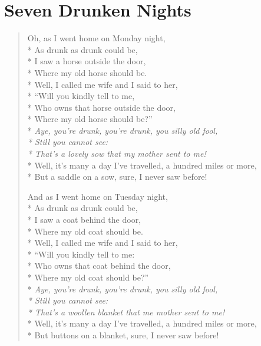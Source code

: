 \documentclass[9pt,twoside]{extarticle}
\newenvironment{xverse}{
	\begin{verse}
	\fontsize{8.5}{10.5}\selectfont
}{
	\end{verse}
}
\begin{document}
\section{Seven Drunken Nights}

\begin{xverse}
Oh, as I went home on Monday night, \\*
As drunk as drunk could be, \\*
I saw a horse outside the door, \\*
Where my old horse should be. \\*
Well, I called me wife and I said to her, \\*
“Will you kindly tell to me, \\*
Who owns that horse outside the door, \\*
Where my old horse should be?” \\*
\textit{Aye, you’re drunk, you’re drunk, you silly old fool, \\*
Still you cannot see: \\*
That’s a lovely sow that my mother sent to me!} \\*
Well, it’s many a day I’ve travelled, a hundred miles or more, \\*
But a saddle on a sow, sure, I never saw before!

And as I went home on Tuesday night, \\*
As drunk as drunk could be, \\*
I saw a coat behind the door, \\*
Where my old coat should be. \\*
Well, I called me wife and I said to her, \\*
“Will you kindly tell to me: \\*
Who owns that coat behind the door, \\*
Where my old coat should be?” \\*
\textit{Aye, you’re drunk, you’re drunk, you silly old fool, \\*
Still you cannot see: \\*
That’s a woollen blanket that me mother sent to me!} \\*
Well, it’s many a day I’ve travelled, a hundred miles or more, \\*
But buttons on a blanket, sure, I never saw before!


\end{xverse}
\end{document}
